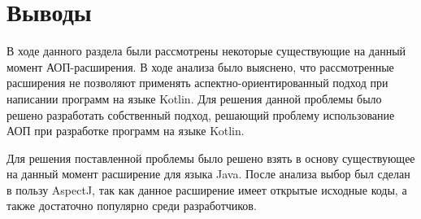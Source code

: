 \section{Выводы}
\label{sec:cap_1_conclusion}
В ходе данного раздела были рассмотрены некоторые существующие на данный момент
АОП-расширения.
В ходе анализа было выяснено, что рассмотренные расширения не позволяют
применять аспектно-ориентированный подход при написании программ на языке
Kotlin.
Для решения данной проблемы было решено разработать собственный подход, решающий
проблему использование АОП при разработке программ на языке Kotlin.

Для решения поставленной проблемы было решено взять в основу существующее на
данный момент расширение для языка Java.
После анализа выбор был сделан в пользу AspectJ, так как данное расширение имеет
открытые исходные коды, а также достаточно популярно среди разработчиков.
